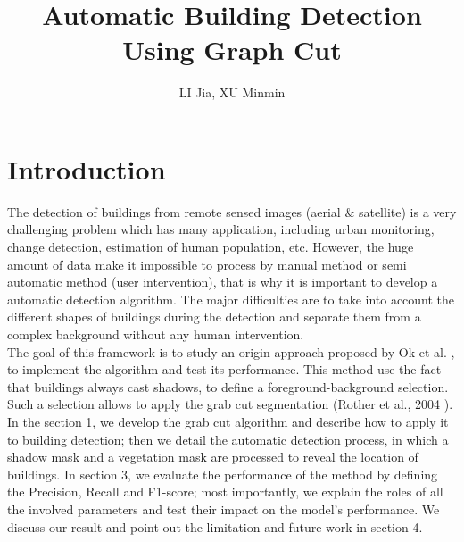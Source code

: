 \documentclass[runningheads]{llncs}
\begin{document}
\pagestyle{headings}
\mainmatter
\def\ECCV14SubNumber{979}  %
\title{Automatic Building Detection Using Graph Cut}



\author{LI Jia, XU Minmin}


\maketitle

\section{Introduction}
The detection of buildings from remote sensed images (aerial \& satellite) is a very challenging problem which has many application, including urban monitoring, change detection, estimation of human population, etc. However, the huge amount of data make it impossible to process by manual method or semi automatic method (user intervention), that is why it is important to develop a automatic detection algorithm. The major difficulties are to take into account the different shapes of buildings during the detection and separate them from a complex background without any human intervention. \\
The goal of this framework is to study an origin approach proposed by Ok et al. \cite{OK:2013}, to implement the algorithm and test its performance. This method use the fact that buildings always cast shadows, to define a foreground-background selection. Such a selection allows to apply the grab cut segmentation (Rother et al., 2004 \cite{Rother:2004}).\\
In the section 1, we develop the grab cut algorithm and describe how to apply it to building detection; then we detail the automatic detection process, in which a shadow mask and a vegetation mask are processed to reveal the location of buildings. In section 3, we evaluate the performance of the method by defining the Precision, Recall and F1-score; most importantly, we explain the roles of all the involved parameters and test their impact on the model's performance. We discuss our result and point out the limitation and future work in section 4.
\end{document}
